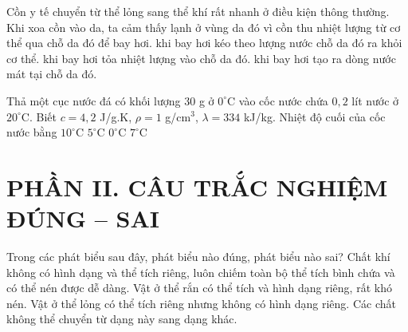 \begin{ex}
Cồn y tế chuyển từ thể lỏng sang thể khí rất nhanh ở điều kiện thông thường. Khi xoa cồn vào da, ta cảm thấy lạnh ở vùng da đó vì cồn
\choice
{\True thu nhiệt lượng từ cơ thể qua chỗ da đó để bay hơi.}
{khi bay hơi kéo theo lượng nước chỗ da đó ra khỏi cơ thể.}
{khi bay hơi tỏa nhiệt lượng vào chỗ da đó.}
{khi bay hơi tạo ra dòng nước mát tại chỗ da đó.}
\end{ex}

\begin{ex}
Thả một cục nước đá có khối lượng $30$ g ở $0^\circ\mathrm{C}$ vào cốc nước chứa $0,2$ lít nước ở $20^\circ\mathrm{C}$. Biết $c=4,2$ J/g.K, $\rho=1$ g/cm$^3$, $\lambda=334$ kJ/kg. Nhiệt độ cuối của cốc nước bằng
\choice
{$10^\circ\mathrm{C}$}
{$5^\circ\mathrm{C}$}
{$0^\circ\mathrm{C}$}
{\True $7^\circ\mathrm{C}$}
\loigiai{\[m_n=200\ \mathrm{g},\quad Q_n=200\cdot4,2\cdot20=16800\ \mathrm{J}.\]
\[Q_{nc}=30\cdot334=10020\ \mathrm{J}.\]
\[6780=230\cdot4,2\cdot T\Rightarrow T\approx7^\circ\mathrm{C}.\]}
\end{ex}

\section*{PHẦN II. CÂU TRẮC NGHIỆM ĐÚNG -- SAI}

\begin{ex}
Trong các phát biểu sau đây, phát biểu nào đúng, phát biểu nào sai?
\choiceTF
{\True Chất khí không có hình dạng và thể tích riêng, luôn chiếm toàn bộ thể tích bình chứa và có thể nén được dễ dàng.}
{\True Vật ở thể rắn có thể tích và hình dạng riêng, rất khó nén.}
{\True Vật ở thể lỏng có thể tích riêng nhưng không có hình dạng riêng.}
{Các chất không thể chuyển từ dạng này sang dạng khác.}
\end{ex}

